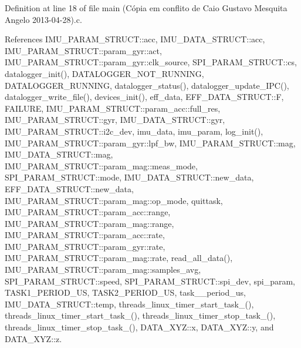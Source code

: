 Definition at line 18 of file main (\-Cópia em conflito de Caio Gustavo Mesquita Angelo 2013-\/04-\/28).\-c.



References I\-M\-U\-\_\-\-P\-A\-R\-A\-M\-\_\-\-S\-T\-R\-U\-C\-T\-::acc, I\-M\-U\-\_\-\-D\-A\-T\-A\-\_\-\-S\-T\-R\-U\-C\-T\-::acc, I\-M\-U\-\_\-\-P\-A\-R\-A\-M\-\_\-\-S\-T\-R\-U\-C\-T\-::param\-\_\-gyr\-::act, I\-M\-U\-\_\-\-P\-A\-R\-A\-M\-\_\-\-S\-T\-R\-U\-C\-T\-::param\-\_\-gyr\-::clk\-\_\-source, S\-P\-I\-\_\-\-P\-A\-R\-A\-M\-\_\-\-S\-T\-R\-U\-C\-T\-::cs, datalogger\-\_\-init(), D\-A\-T\-A\-L\-O\-G\-G\-E\-R\-\_\-\-N\-O\-T\-\_\-\-R\-U\-N\-N\-I\-N\-G, D\-A\-T\-A\-L\-O\-G\-G\-E\-R\-\_\-\-R\-U\-N\-N\-I\-N\-G, datalogger\-\_\-status(), datalogger\-\_\-update\-\_\-\-I\-P\-C(), datalogger\-\_\-write\-\_\-file(), devices\-\_\-init(), eff\-\_\-data, E\-F\-F\-\_\-\-D\-A\-T\-A\-\_\-\-S\-T\-R\-U\-C\-T\-::\-F, F\-A\-I\-L\-U\-R\-E, I\-M\-U\-\_\-\-P\-A\-R\-A\-M\-\_\-\-S\-T\-R\-U\-C\-T\-::param\-\_\-acc\-::full\-\_\-res, I\-M\-U\-\_\-\-P\-A\-R\-A\-M\-\_\-\-S\-T\-R\-U\-C\-T\-::gyr, I\-M\-U\-\_\-\-D\-A\-T\-A\-\_\-\-S\-T\-R\-U\-C\-T\-::gyr, I\-M\-U\-\_\-\-P\-A\-R\-A\-M\-\_\-\-S\-T\-R\-U\-C\-T\-::i2c\-\_\-dev, imu\-\_\-data, imu\-\_\-param, log\-\_\-init(), I\-M\-U\-\_\-\-P\-A\-R\-A\-M\-\_\-\-S\-T\-R\-U\-C\-T\-::param\-\_\-gyr\-::lpf\-\_\-bw, I\-M\-U\-\_\-\-P\-A\-R\-A\-M\-\_\-\-S\-T\-R\-U\-C\-T\-::mag, I\-M\-U\-\_\-\-D\-A\-T\-A\-\_\-\-S\-T\-R\-U\-C\-T\-::mag, I\-M\-U\-\_\-\-P\-A\-R\-A\-M\-\_\-\-S\-T\-R\-U\-C\-T\-::param\-\_\-mag\-::meas\-\_\-mode, S\-P\-I\-\_\-\-P\-A\-R\-A\-M\-\_\-\-S\-T\-R\-U\-C\-T\-::mode, I\-M\-U\-\_\-\-D\-A\-T\-A\-\_\-\-S\-T\-R\-U\-C\-T\-::new\-\_\-data, E\-F\-F\-\_\-\-D\-A\-T\-A\-\_\-\-S\-T\-R\-U\-C\-T\-::new\-\_\-data, I\-M\-U\-\_\-\-P\-A\-R\-A\-M\-\_\-\-S\-T\-R\-U\-C\-T\-::param\-\_\-mag\-::op\-\_\-mode, quittask, I\-M\-U\-\_\-\-P\-A\-R\-A\-M\-\_\-\-S\-T\-R\-U\-C\-T\-::param\-\_\-acc\-::range, I\-M\-U\-\_\-\-P\-A\-R\-A\-M\-\_\-\-S\-T\-R\-U\-C\-T\-::param\-\_\-mag\-::range, I\-M\-U\-\_\-\-P\-A\-R\-A\-M\-\_\-\-S\-T\-R\-U\-C\-T\-::param\-\_\-acc\-::rate, I\-M\-U\-\_\-\-P\-A\-R\-A\-M\-\_\-\-S\-T\-R\-U\-C\-T\-::param\-\_\-gyr\-::rate, I\-M\-U\-\_\-\-P\-A\-R\-A\-M\-\_\-\-S\-T\-R\-U\-C\-T\-::param\-\_\-mag\-::rate, read\-\_\-all\-\_\-data(), I\-M\-U\-\_\-\-P\-A\-R\-A\-M\-\_\-\-S\-T\-R\-U\-C\-T\-::param\-\_\-mag\-::samples\-\_\-avg, S\-P\-I\-\_\-\-P\-A\-R\-A\-M\-\_\-\-S\-T\-R\-U\-C\-T\-::speed, S\-P\-I\-\_\-\-P\-A\-R\-A\-M\-\_\-\-S\-T\-R\-U\-C\-T\-::spi\-\_\-dev, spi\-\_\-param, T\-A\-S\-K1\-\_\-\-P\-E\-R\-I\-O\-D\-\_\-\-U\-S, T\-A\-S\-K2\-\_\-\-P\-E\-R\-I\-O\-D\-\_\-\-U\-S, task\-\_\-\_\-period\-\_\-us, I\-M\-U\-\_\-\-D\-A\-T\-A\-\_\-\-S\-T\-R\-U\-C\-T\-::temp, threads\-\_\-linux\-\_\-timer\-\_\-start\-\_\-task\-\_(), threads\-\_\-linux\-\_\-timer\-\_\-start\-\_\-task\-\_(), threads\-\_\-linux\-\_\-timer\-\_\-stop\-\_\-task\-\_(), threads\-\_\-linux\-\_\-timer\-\_\-stop\-\_\-task\-\_(), D\-A\-T\-A\-\_\-\-X\-Y\-Z\-::x, D\-A\-T\-A\-\_\-\-X\-Y\-Z\-::y, and D\-A\-T\-A\-\_\-\-X\-Y\-Z\-::z.


